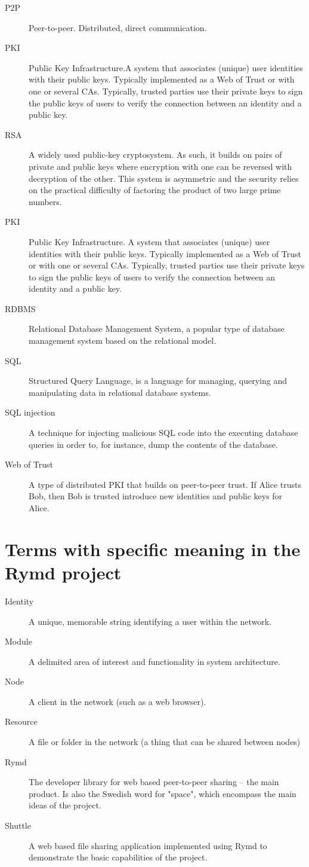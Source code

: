 \begin{description}
  \item[P2P] Peer-to-peer. Distributed, direct communication.
  \item[PKI] Public Key Infrastructure.A system that associates (unique) user identities with their public keys. Typically implemented as a Web of Trust or with one or several CAs. Typically, trusted parties use their private keys to sign the public keys of users to verify the connection between an identity and a public key.
  \item[RSA] A widely used public-key cryptosystem. As such, it builds on pairs of private and public keys where encryption with one can be reversed with decryption of the other. This system is asymmetric and the security relies on the practical difficulty of factoring the product of two large prime numbers.
  \item[PKI] Public Key Infrastructure. A system that associates (unique) user identities with their public keys. Typically implemented as a Web of Trust or with one or several CAs. Typically, trusted parties use their private keys to sign the public keys of users to verify the connection between an identity and a public key.
  \item[RDBMS] Relational Database Management System, a popular type of database management system based on the relational model.
  \item[SQL] Structured Query Language, is a language for managing, querying and manipulating data in relational database systems.
  \item[SQL injection] A technique for injecting malicious SQL code into the executing database queries in order to, for instance, dump the contents of the database.
  \item[Web of Trust] A type of distributed PKI that builds on peer-to-peer trust. If Alice trusts Bob, then Bob is trusted introduce new identities and public keys for Alice.
\end{description}

\section{Terms with specific meaning in the Rymd project}
\begin{description}
  \item[Identity] A unique, memorable string identifying a user within the network.
  \item[Module] A delimited area of interest and functionality in system architecture.
  \item[Node] A client in the network (such as a web browser).
  \item[Resource] A file or folder in the network (a thing that can be shared between nodes)
  \item[Rymd] The developer library for web based peer-to-peer sharing – the main product. Is also the Swedish word for "space", which encompass the main ideas of the project.
  \item[Shuttle] A web based file sharing application implemented using Rymd to demonstrate the basic capabilities of the project.
\end{description}
